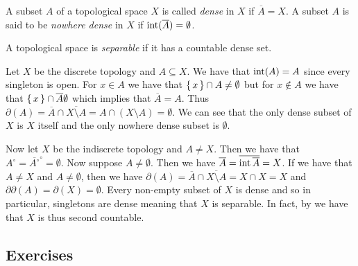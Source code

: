 \documentclass[letterpaper, 11pt, oneside]{book}
\begin{document}
\begin{defn}
  A subset $A$ of a topological space $X$ is called \emph{dense} in $X$ if $\overline{A} = X$.
  A subset $A$ is said to be \emph{nowhere dense} in $X$ if $\operatorname{int}(\overline{A}) = \emptyset$.
\end{defn}

\begin{defn}
  A topological space is \emph{separable} if it has a countable dense set.
\end{defn}

\begin{ex}
  Let $X$ be the discrete topology and $A \subseteq X$.
  We have that $\operatorname{int}(A) = A$ since every singleton is open.
  For $x \in A$ we have that $\set{x} \cap A \neq \emptyset$ but for $x \notin A$ we have that $\set{x} \cap \overline{A} \emptyset$ which implies that $\overline{A} = A$.
  Thus $\partial(A) = \overline{A} \cap \overline{X \setminus A} = A \cap (X \setminus A) =
  \emptyset$.
  We can see that the only dense subset of $X$ is $X$ itself and the only nowhere dense subset is $\emptyset$.

  Now let $X$ be the indiscrete topology and $A \neq X$.
  Then we have that $A^{\circ} = \overline{A^{\circ}}^{\circ} = \emptyset$.
  Now suppose $A \neq \emptyset$.
  Then we have $\overline{A} = \overline{\operatorname{int}{\overline{A}}} = X$.
  If we have that $A \neq X$ and $A \neq \emptyset$, then we have $\partial(A) = \overline{A} \cap \overline{X \setminus A} = X \cap X = X$ and $\partial \partial(A) = \partial(X) = \emptyset$.
  Every non-empty subset of $X$ is dense and so in particular, singletons are dense meaning that $X$ is separable.
  In fact, by  we have that $X$ is thus second countable.

\end{ex}

\clearpage

\subsection*{Exercises}
\end{document}
